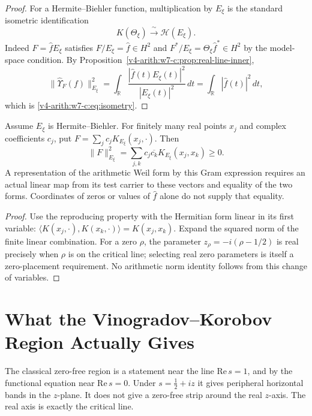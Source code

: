 \begin{proof}
For a Hermite--Biehler function, multiplication by \(E_{\xi}\) is the
standard isometric identification
\[
K(\Theta_{\xi})\xrightarrow{\;\sim\;}\mathcal H(E_{\xi}).
\]
Indeed \(F=\widehat f E_{\xi}\) satisfies \(F/E_{\xi}=\widehat f\in
H^{2}\) and \(F^{*}/E_{\xi}=\Theta_{\xi}\widehat f^{*}\in H^{2}\) by
the model-space condition.  By
Proposition~\ref{v4-arith:w7-c:prop:real-line-inner},
\[
\|\widehat{\Upsilon}_{F}(f)\|_{E_{\xi}}^{2}=\int_{\mathbb{R}}\frac{|\widehat{f}(t)E_{\xi}(t)|^{2}}{|E_{\xi}(t)|^{2}}\,dt
=\int_{\mathbb{R}}|\widehat{f}(t)|^{2}\,dt,
\]
which is \eqref{v4-arith:w7-c:eq:isometry}.
\end{proof}

\begin{corollary}
\label{v4-arith:w7-c:cor:ATP-as-dB-positivity}
Assume \(E_\xi\) is Hermite--Biehler. For finitely many real
points \(x_j\) and complex coefficients \(c_j\), put
\(F=\sum_j c_j K_{E_\xi}(x_j,\cdot)\). Then
\begin{equation}
\label{v4-arith:w7-c:eq:ATP-dB}
 \|F\|_{E_\xi}^2
 =\sum_{j,k}c_j\overline{c_k}K_{E_\xi}(x_j,x_k)\geq0.
\end{equation}
A representation of the arithmetic Weil form by this Gram expression
requires an actual linear map from its test carrier to these vectors
and equality of the two forms. Coordinates of zeros or values of
\(\widehat f\) alone do not supply that equality.
\end{corollary}
\begin{proof}
Use the reproducing property with the Hermitian form linear in its
first variable: \(\langle K(x_j,\cdot),K(x_k,\cdot)\rangle
=K(x_j,x_k)\). Expand the squared norm of the finite linear
combination. For a zero \(\rho\), the parameter
\(z_\rho=-i(\rho-1/2)\) is real precisely when \(\rho\) is on
the critical line; selecting real zero parameters is itself a
zero-placement requirement. No arithmetic norm identity follows
from this change of variables.
\end{proof}

\section{What the Vinogradov--Korobov Region Actually Gives}
\label{v4-arith:w7-c:VK-strip}

The classical zero-free region is a statement near the line
\(\mathrm{Re}\,s=1\), and by the functional equation near
\(\mathrm{Re}\,s=0\). Under \(s=\tfrac12+iz\) it gives peripheral
horizontal bands in the \(z\)-plane. It does not give a zero-free
strip around the real \(z\)-axis. The real axis is exactly the
critical line.


